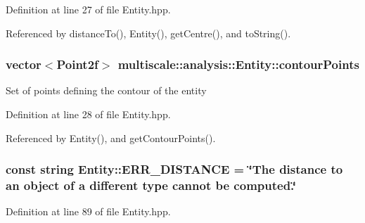 \-Definition at line 27 of file \-Entity.\-hpp.



\-Referenced by distance\-To(), \-Entity(), get\-Centre(), and to\-String().

\hypertarget{classmultiscale_1_1analysis_1_1Entity_a0199b0a0e5b22809015ecbc23d17785e}{
\subsubsection[{contour\-Points}]{\setlength{\rightskip}{0pt plus 5cm}vector$<$\-Point2f$>$ {\bf multiscale\-::analysis\-::\-Entity\-::contour\-Points}}}\label{classmultiscale_1_1analysis_1_1Entity_a0199b0a0e5b22809015ecbc23d17785e}
\-Set of points defining the contour of the entity 

\-Definition at line 28 of file \-Entity.\-hpp.



\-Referenced by \-Entity(), and get\-Contour\-Points().

\hypertarget{classmultiscale_1_1analysis_1_1Entity_a0904a1ab1e3f71e0702ace23b665cf0e}{
\subsubsection[{\-E\-R\-R\-\_\-\-D\-I\-S\-T\-A\-N\-C\-E}]{\setlength{\rightskip}{0pt plus 5cm}const string {\bf \-Entity\-::\-E\-R\-R\-\_\-\-D\-I\-S\-T\-A\-N\-C\-E} = \char`\"{}\-The distance to an object of a different type cannot be computed.\char`\"{}}}\label{classmultiscale_1_1analysis_1_1Entity_a0904a1ab1e3f71e0702ace23b665cf0e}


\-Definition at line 89 of file \-Entity.\-hpp.

